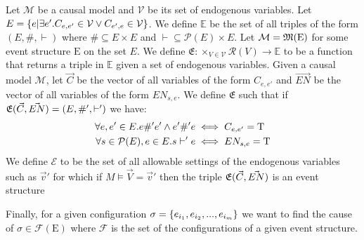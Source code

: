 Let $\mathcal{M}$ be a causal model and $\mathcal{V}$ be its set of
endogenous variables.
Let $E = \{e|\exists e'. C_{e,e'} \in \mathcal{V} \vee C_{e',e} \in \mathcal{V} \}$.
We define $\mathbb{E}$ be the set of all
triples of the form $(E,\#,\vdash)$ where $\# \subseteq E \times E$
and $\vdash \subseteq \mathcal{P}(E) \times E$.
Let $\mathcal{M} = \mathfrak{M}(\mathrm{E})$ for some event structure
$\mathrm{E}$ on the set $E$.
We define $\mathfrak{E}: \times_{V \in \mathcal{V}} \mathcal{R}(V) \rightarrow \mathbb{E}$
to be a function that returns a triple in $\mathbb{E}$ given a set of
endogenous variables.
Given a causal model $\mathcal{M}$, let $\vec C$ be the vector of all
variables of the form $C_{e,e'}$ and $\vec{EN}$ be the vector of all
variables of the form $EN_{s,e}$.
We define $\mathfrak{E}$ such that if
$\mathfrak{E}(\vec C,\vec {EN}) = (E, \#',\vdash')$ we have:
\begin{align*}
    \forall e,e' \in E. e \#' e' \wedge e' \#' e
     & \iff C_{e,e'} = \mathrm{T} \\
    \forall s \in \mathcal{P}(E), e \in E.  s \vdash' e
     & \iff EN_{s,e} = \mathrm{T}
\end{align*}
We define $\mathcal{E}$ to be the set of all allowable
settings of the endogenous variables such as $\vec v'$
for which if $M \vDash \vec V = \vec v'$ then the triple $\mathfrak{E}(\vec C,\vec {EN})$ is an event structure 

Finally, for a given configuration $\sigma = \{e_{i_1},e_{i_2},...,e_{i_m}\}$
we want to find the cause of
$\sigma \in \mathcal{F}(\mathrm{E})$ where $\mathcal{F}$
is the set of the configurations of a given event structure.

